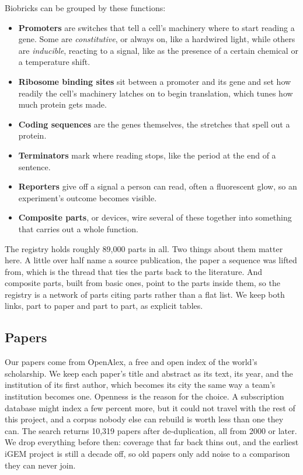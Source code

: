 \documentclass[12pt,a4paper]{article}
\begin{document}
	
	Biobricks can be grouped by these functions:
	\begin{itemize}
		\item \textbf{Promoters} are switches that tell a cell's machinery where to start reading a gene. Some are \emph{constitutive}, or always on, like a hardwired light, while others are \emph{inducible}, reacting to a signal, like as the presence of a certain chemical or a temperature shift.
		\item \textbf{Ribosome binding sites} sit between a promoter and its gene and set how readily the cell's machinery latches on to begin translation, which tunes how much protein gets made.
		\item \textbf{Coding sequences} are the genes themselves, the stretches that spell out a protein.
		\item \textbf{Terminators} mark where reading stops, like the period at the end of a sentence.
		\item \textbf{Reporters} give off a signal a person can read, often a fluorescent glow, so an experiment's outcome becomes visible.
		\item \textbf{Composite parts}, or devices, wire several of these together into something that carries out a whole function.
	\end{itemize}
	
	The registry holds roughly 89,000 parts in all. Two things about them matter here. A little over half name a source publication, the paper a sequence was lifted from, which is the thread that ties the parts back to the literature. And composite parts, built from basic ones, point to the parts inside them, so the registry is a network of parts citing parts rather than a flat list. We keep both links, part to paper and part to part, as explicit tables.

	\subsection{Papers}
	
	Our papers come from OpenAlex, a free and open index of the world's scholarship. We keep each paper's title and abstract as its text, its year, and the institution of its first author, which becomes its city the same way a team's institution becomes one. Openness is the reason for the choice. A subscription database might index a few percent more, but it could not travel with the rest of this project, and a corpus nobody else can rebuild is worth less than one they can. The search returns 10,319 papers after de-duplication, all from 2000 or later. We drop everything before then: coverage that far back thins out, and the earliest iGEM project is still a decade off, so old papers only add noise to a comparison they can never join.
	
\end{document}
